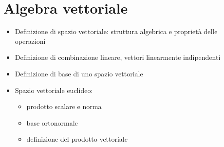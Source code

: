 \documentclass[letterpaper,10pt,italian]{jupyterBook}
\begin{document}
\chapter{Algebra vettoriale}
\label{\detokenize{ch/algebra/vector-algebra:algebra-vettoriale}}\label{\detokenize{ch/algebra/vector-algebra:math-hs-algebra-vector}}\label{\detokenize{ch/algebra/vector-algebra::doc}}\begin{itemize}
\item {} 
\sphinxAtStartPar
Definizione di spazio vettoriale: struttura algebrica e proprietà delle operazioni

\item {} 
\sphinxAtStartPar
Definizione di combinazione lineare, vettori linearmente indipendenti

\item {} 
\sphinxAtStartPar
Definizione di base di uno spazio vettoriale

\item {} 
\sphinxAtStartPar
Spazio vettoriale euclideo:
\begin{itemize}
\item {} 
\sphinxAtStartPar
prodotto scalare e norma

\item {} 
\sphinxAtStartPar
base ortonormale

\item {} 
\sphinxAtStartPar
definizione del prodotto vettoriale

\end{itemize}

\end{itemize}

\sphinxstepscope
\end{document}
